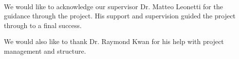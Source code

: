 \noindent\

We would like to acknowledge our supervisor Dr. Matteo Leonetti for the guidance through the project. His support and supervision guided the project through to a final success.

We would also like to thank Dr. Raymond Kwan for his help with project management and structure.